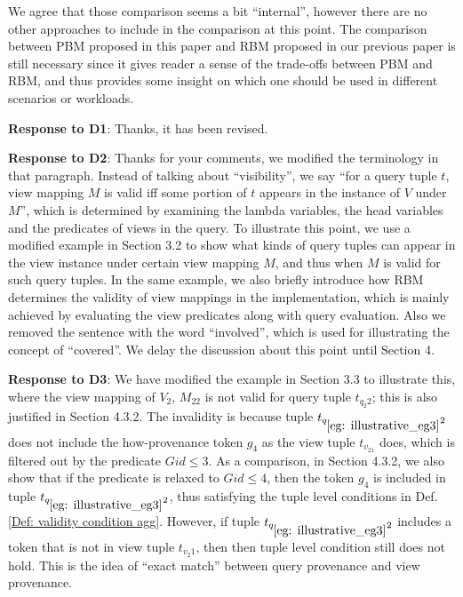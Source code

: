 \begin{appendix}
We agree that those comparison seems a bit ``internal'', however there are no other approaches to include in the comparison at this point. The comparison between PBM proposed in this paper and RBM proposed in our previous paper is still necessary since it gives reader a sense of the trade-offs between PBM and RBM, and thus provides some insight on which one should be used in different scenarios or workloads. 

\textbf{Response to D1}:
Thanks, it has been revised.

\textbf{Response to D2}: Thanks for your comments, we modified the terminology in that paragraph. Instead of talking about ``visibility'',  we say ``for a query tuple $t$, view mapping $M$ is valid iff some portion of $t$ appears in the instance of $V$ under $M$'', which is determined by examining the lambda variables, the head variables and the predicates of views in the query. To illustrate this point, we use a modified example in Section 3.2 to show what kinds of query tuples can appear in the view instance under certain view mapping $M$, and thus when $M$ is valid for such query tuples. In the same example, we also briefly introduce how RBM determines the validity of view mappings in the implementation, which is mainly achieved by evaluating the view predicates along with query evaluation. 
Also we removed the sentence with the word ``involved'', which is used for illustrating the concept of ``covered''. We delay the discussion about this point until Section 4.

\textbf{Response to D3}:
We have modified the example in Section 3.3 to illustrate this, where the view mapping of $V_2$, $M_{22}$ is not valid for query tuple $t_{{q_2}2}$; this is also justified in Section 4.3.2. The invalidity is because tuple $t_{q_{\ref{eg: illustrative_eg3}}2}$ does not include the how-provenance token $g_4$ as the view tuple $t_{v_21}$ does, which is filtered out by the predicate $Gid \leq 3$. As a comparison, in Section 4.3.2, we also show that if the predicate is relaxed to $Gid \leq 4$, then the token $g_4$ is included in tuple $t_{q_{\ref{eg: illustrative_eg3}}2}$, thus satisfying the tuple level conditions in Def. \ref{Def: validity condition agg}. However, if tuple $t_{q_{\ref{eg: illustrative_eg3}}2}$ includes a token that is not in view tuple $t_{{v_2}1}$, then then tuple level condition still does not hold. This is the idea of ``exact match'' between query provenance and view provenance.


\end{appendix}
